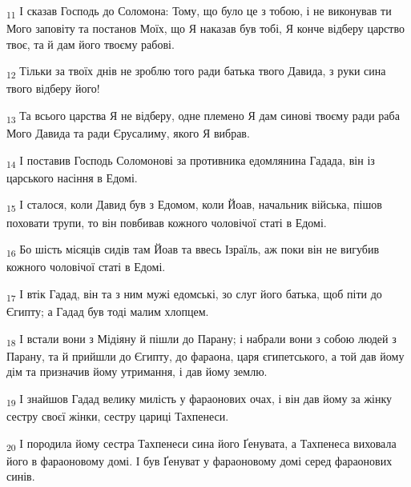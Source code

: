 \begin{tcolorbox}
\textsubscript{11} І сказав Господь до Соломона: Тому, що було це з тобою, і не виконував ти Мого заповіту та постанов Моїх, що Я наказав був тобі, Я конче відберу царство твоє, та й дам його твоєму рабові.
\end{tcolorbox}
\begin{tcolorbox}
\textsubscript{12} Тільки за твоїх днів не зроблю того ради батька твого Давида, з руки сина твого відберу його!
\end{tcolorbox}
\begin{tcolorbox}
\textsubscript{13} Та всього царства Я не відберу, одне племено Я дам синові твоєму ради раба Мого Давида та ради Єрусалиму, якого Я вибрав.
\end{tcolorbox}
\begin{tcolorbox}
\textsubscript{14} І поставив Господь Соломонові за противника едомлянина Гадада, він із царського насіння в Едомі.
\end{tcolorbox}
\begin{tcolorbox}
\textsubscript{15} І сталося, коли Давид був з Едомом, коли Йоав, начальник війська, пішов поховати трупи, то він повбивав кожного чоловічої статі в Едомі.
\end{tcolorbox}
\begin{tcolorbox}
\textsubscript{16} Бо шість місяців сидів там Йоав та ввесь Ізраїль, аж поки він не вигубив кожного чоловічої статі в Едомі.
\end{tcolorbox}
\begin{tcolorbox}
\textsubscript{17} І втік Гадад, він та з ним мужі едомські, зо слуг його батька, щоб піти до Єгипту; а Гадад був тоді малим хлопцем.
\end{tcolorbox}
\begin{tcolorbox}
\textsubscript{18} І встали вони з Мідіяну й пішли до Парану; і набрали вони з собою людей з Парану, та й прийшли до Єгипту, до фараона, царя єгипетського, а той дав йому дім та призначив йому утримання, і дав йому землю.
\end{tcolorbox}
\begin{tcolorbox}
\textsubscript{19} І знайшов Гадад велику милість у фараонових очах, і він дав йому за жінку сестру своєї жінки, сестру цариці Тахпенеси.
\end{tcolorbox}
\begin{tcolorbox}
\textsubscript{20} І породила йому сестра Тахпенеси сина його Ґенувата, а Тахпенеса виховала його в фараоновому домі. І був Ґенуват у фараоновому домі серед фараонових синів.
\end{tcolorbox}
